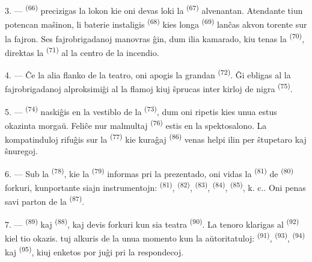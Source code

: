 3. ---  \textsuperscript{(66)} precizigas la lokon kie oni
devas loki la  \textsuperscript{(67)} alvenantan.
Atendante tiun potencan maŝinon, li baterie instaligis 
\textsuperscript{(68)} kies longa  \textsuperscript{(69)} lanĉas
akvon torente sur la fajron. Ses fajrobrigadanoj manovras ĝin, dum ilia
kamarado, kiu tenas la  \textsuperscript{(70)}, direktas la
 \textsuperscript{(71)} al la centro de la incendio.

4. --- Ĉe la alia flanko de la teatro, oni apogis la grandan
 \textsuperscript{(72)}. Ĝi ebligas al la fajrobrigadanoj
alproksimiĝi al la flamoj kiuj ŝprucas inter kirloj de nigra 
\textsuperscript{(75)}.

\VUsaut{5.0mm}
\VUsaut{3.4mm}

5. ---  \textsuperscript{(74)} naskiĝis en la vestiblo de la
 \textsuperscript{(73)}, dum oni ripetis  kies
unua  estus okazinta morgaŭ. Feliĉe nur malmultaj
 \textsuperscript{(76)} estis en la spektosalono. La
kompatinduloj rifuĝis sur la  \textsuperscript{(77)} kie
kuraĝaj  \textsuperscript{(86)} venas helpi ilin per
ŝtupetaro kaj ŝnuregoj.

6. --- Sub la  \textsuperscript{(78)}, kie la 
\textsuperscript{(79)} informas pri la prezentado, oni vidas la
 \textsuperscript{(81)} de 
\textsuperscript{(80)} forkuri, kunportante siajn instrumentojn:
 \textsuperscript{(81)},  \textsuperscript{(82)},
 \textsuperscript{(83)}, 
\textsuperscript{(84)},  \textsuperscript{(85)}, k. c.. Oni
penas savi parton de la  \textsuperscript{(87)}.

7. ---  \textsuperscript{(89)} kaj 
\textsuperscript{(88)},  kaj  devis
forkuri kun sia teatra  \textsuperscript{(90)}. La tenoro
klarigas al  \textsuperscript{(92)} kiel tio okazis.
 tuj alkuris de la unua momento kun la
aŭtoritatuloj:  \textsuperscript{(91)}, 
\textsuperscript{(93)},  \textsuperscript{(94)} kaj
 \textsuperscript{(95)}, kiuj enketos por juĝi pri la
respondecoj.
\VUsaut{6.0mm}
\VUfilet{22mm}
